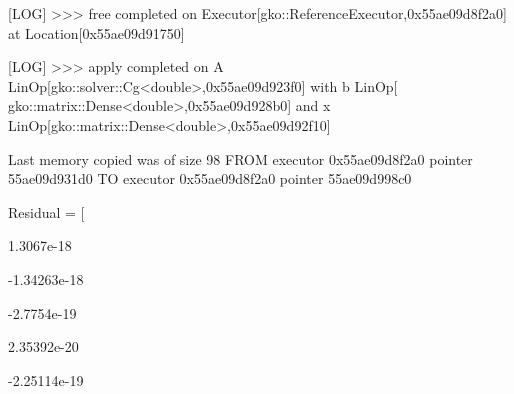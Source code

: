 \begin{DoxyCode}
                                                               
[LOG] >>> free completed on Executor[gko::ReferenceExecutor,0x55ae09d8f2a0] at Location[0x55ae09d91750]    
                                                                                                                  
                                                               
[LOG] >>> apply completed on A LinOp[gko::solver::Cg<double>,0x55ae09d923f0] with b LinOp[
      gko::matrix::Dense<double>,0x55ae09d928b0] and x LinOp[gko::matrix::Dense<double>,0x55ae09d92f10]                            
                                                               
Last memory copied was of size 98 FROM executor 0x55ae09d8f2a0 pointer 55ae09d931d0 TO executor 
      0x55ae09d8f2a0 pointer 55ae09d998c0                                                                                    
                                                               
Residual = [                                                                                               
                                                                                                                  
                                                               
    1.3067e-18                                                                                             
                                                                                                                  
                    
    -1.34263e-18                                                                                           
                                                                                                                  
                                                               
    -2.7754e-19                                                                                            
                                                                                                                  
                          
    2.35392e-20                                                                                            
                                                                                                                  
                                                               
    -2.25114e-19                                                                                           
                                                                                                                  

\end{DoxyCode}

